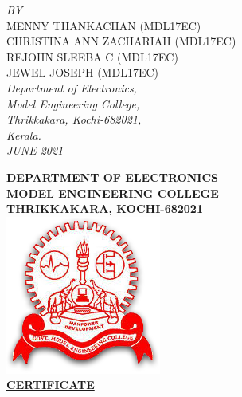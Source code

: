 \documentclass[10pt]{report}
\begin{document}
\begin{titlepage}

\Large \emph{BY}\\

MENNY THANKACHAN (MDL17EC)\\
CHRISTINA ANN ZACHARIAH (MDL17EC)\\
REJOHN SLEEBA C (MDL17EC)\\
JEWEL JOSEPH (MDL17EC)\\[1cm]


\large \emph{Department of Electronics, \\
Model Engineering College, \\ Thrikkakara,
Kochi-682021,\\  Kerala.}
\\[0.5cm] %

\Large \emph{JUNE 2021}

\vfill %

\end{titlepage}


\newpage
\thispagestyle{empty}
\linespread{1.4}
\Large \begin{center} \textbf{DEPARTMENT OF ELECTRONICS}\\
\Large \textbf{MODEL ENGINEERING COLLEGE}\\
\large \textbf{THRIKKAKARA, KOCHI-682021}\\[0.5cm]
\includegraphics[scale=.5]{mec.png}\\
{ \Large \bfseries \underline {CERTIFICATE}} \\\end{center}  
\end{document}
